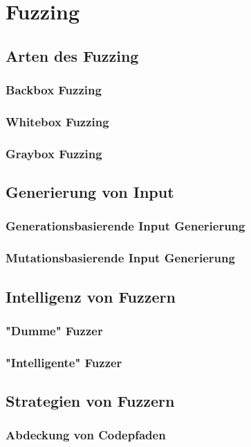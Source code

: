 
\section{Fuzzing}\label{sec:fuzzing}
\subsection{Arten des Fuzzing}\label{subsec:arten-des-fuzzing}
\subsubsection{Backbox Fuzzing}
\subsubsection{Whitebox Fuzzing}
\subsubsection{Graybox Fuzzing}
\subsection{Generierung von Input}\label{subsec:generierung-von-input}
\subsubsection{Generationsbasierende Input Generierung}
\subsubsection{Mutationsbasierende Input Generierung}
\subsection{Intelligenz von Fuzzern}\label{subsec:intelligenz-von-fuzzern}
\subsubsection{"Dumme" Fuzzer}
\subsubsection{"Intelligente" Fuzzer}
\subsection{Strategien von Fuzzern}\label{subsec:strategien-von-fuzzern}
\subsubsection{Abdeckung von Codepfaden}
